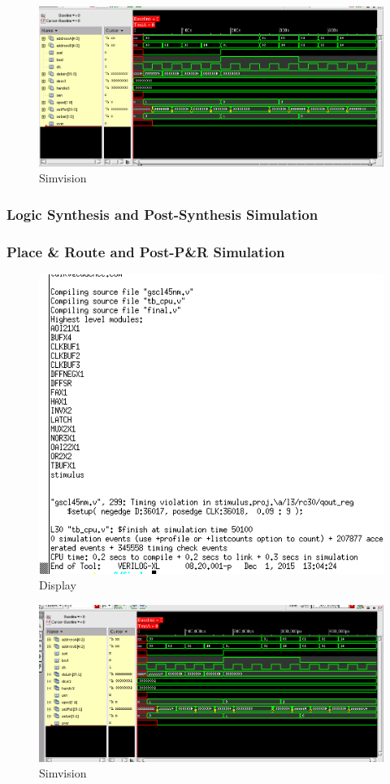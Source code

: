 \documentclass[12pt]{article}
\begin{document}
\begin{figure}[H]
	\centering
	\includegraphics[width=\linewidth]{../CSA/CSA-test}
	\caption{Simvision}
	\label{fig:CSA-test}
\end{figure}
\subsubsection{Logic Synthesis and Post-Synthesis Simulation}

\subsubsection{Place \& Route and Post-P\&R Simulation}
\begin{figure}[H]
\centering
\includegraphics[width=.7\linewidth]{../CSA/EC-text}
\caption{Display}
\label{fig:EC-text}
\end{figure}
\begin{figure}[H]
\centering
\includegraphics[width=.7\linewidth]{../CSA/EC}
\caption{Simvision}
\label{fig:EC}
\end{figure}
\end{document}
